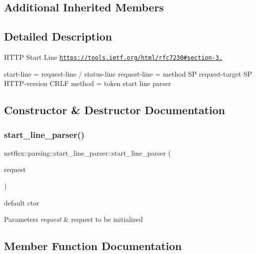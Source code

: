 \subsection*{Additional Inherited Members}


\subsection{Detailed Description}
H\+T\+TP Start Line \href{https://tools.ietf.org/html/rfc7230#section-3.1}{\tt https\+://tools.\+ietf.\+org/html/rfc7230\#section-\/3.}

start-\/line = request-\/line / status-\/line request-\/line = method SP request-\/target SP H\+T\+T\+P-\/version C\+R\+LF method = token start line parser 

\subsection{Constructor \& Destructor Documentation}
\mbox{\label{classnetflex_1_1parsing_1_1start__line__parser_a8a8554f0cfedc23f4955f5fcd4fa2a30}} 
\subsubsection{\texorpdfstring{start\+\_\+line\+\_\+parser()}{start\_line\_parser()}}
{\footnotesize\ttfamily netflex\+::parsing\+::start\+\_\+line\+\_\+parser\+::start\+\_\+line\+\_\+parser (\begin{DoxyParamCaption}\item[{\hyperlink{classnetflex_1_1http_1_1request}{http\+::request} \&}]{request }\end{DoxyParamCaption})\hspace{0.3cm}{\ttfamily [explicit]}}

default ctor


\begin{DoxyParams}{Parameters}
{\em request} & request to be initialized \\
\hline
\end{DoxyParams}


\subsection{Member Function Documentation}
\mbox{\label{classnetflex_1_1parsing_1_1start__line__parser_a7b32cf1d39bfaa78d76dff258d984f95}} 
